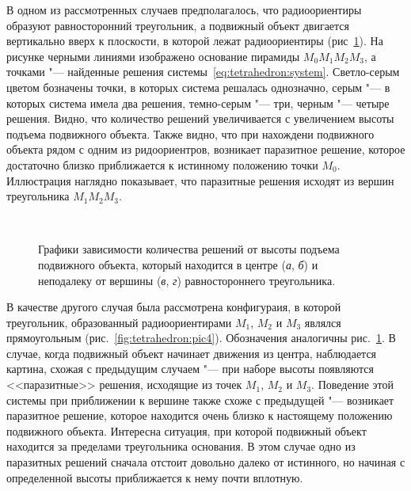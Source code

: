 \documentclass[../main.tex]{subfiles}
\begin{document}
В одном из рассмотренных случаев предполагалось, что радиоориентиры образуют равносторонний треугольник, а подвижный объект двигается вертикально вверх к плоскости, в которой лежат радиоориентиры (рис~\ref{fig:tetrahedron:pic3}). На рисунке черными линиями изображено основание пирамиды $M_0 M_1 M_2 M_3$, а точками "--- найденные решения системы~\eqref{eq:tetrahedron:system}. Светло-серым цветом бозначены точки, в которых система решалась однозначно, серым "--- в которых система имела два решения, темно-серым "--- три, черным "--- четыре решения. Видно, что количество решений увеличивается с увеличением высоты подъема подвижного объекта. Также видно, что при нахождени подвижного объекта рядом с одним из ридоориентров, возникает паразитное решение, которое достаточно близко приближается к истинному положению точки $M_0$. Иллюстрация наглядно показывает, что паразитные решения исходят из вершин треугольника $M_1 M_2 M_3$.

\begin{figure}[tb]
  \centering
  \qquad
  \\
  \qquad

  \caption{Графики зависимости количества решений от высоты подъема подвижного объекта, который находится в центре (\textit{а}, \textit{б}) и неподалеку от вершины (\textit{в}, \textit{г}) равностороннего треугольника.}
  \label{fig:tetrahedron:pic3}
\end{figure}

В качестве другого случая была рассмотрена конфигураия, в которой треугольник, образованный радиоориентирами $M_1$, $M_2$ и $M_3$ являлся прямоугольным (рис.~\ref{fig:tetrahedron:pic4}). Обозначения аналогичны рис.~\ref{fig:tetrahedron:pic3}. В случае, когда подвижный объект начинает движения из центра, наблюдается картина, схожая с предыдущим случаем "--- при наборе высоты появляются <<паразитные>> решения, исходящие из точек $M_1$, $M_2$ и $M_3$. Поведение этой системы при приближении к вершине также схоже с предыдущей "--- возникает паразитное решение, которое находится очень близко к настоящему положению подвижного объекта. Интересна ситуация, при которой подвижный объект находится за пределами треугольника основания. В этом случае одно из паразитных решений сначала отстоит довольно далеко от истинного, но начиная с определенной высоты приближается к нему почти вплотную.
\end{document}
